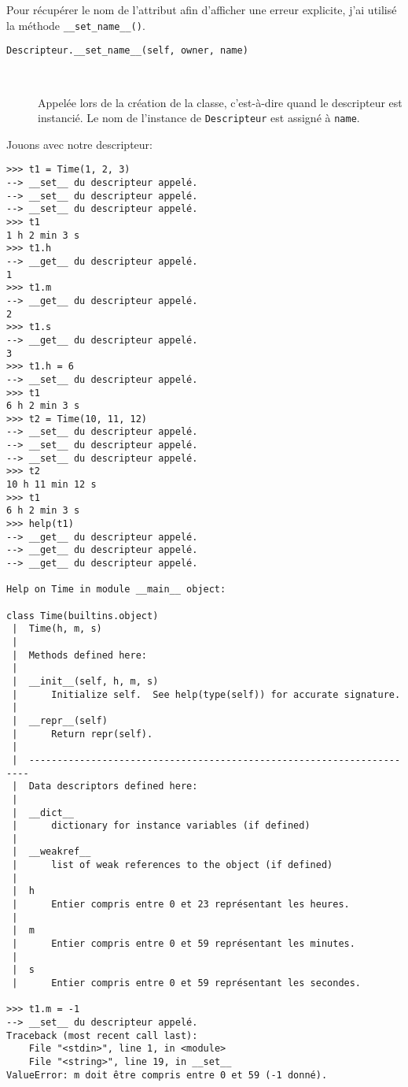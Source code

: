 Pour récupérer le nom de l'attribut afin d'afficher une erreur explicite, j'ai utilisé la méthode \texttt{__set_name__()}.

\begin{description}
    \item[\texttt{Descripteur.__set_name__(self, owner, name)}]~
    
    Appelée lors de la création de la classe, c'est-à-dire quand le descripteur est instancié. Le nom de l'instance de \texttt{Descripteur} est assigné à \texttt{name}.
\end{description}

Jouons avec notre descripteur:

\begin{verbatim}
>>> t1 = Time(1, 2, 3)
--> __set__ du descripteur appelé.
--> __set__ du descripteur appelé.
--> __set__ du descripteur appelé.
>>> t1
1 h 2 min 3 s
>>> t1.h
--> __get__ du descripteur appelé.
1
>>> t1.m
--> __get__ du descripteur appelé.
2
>>> t1.s
--> __get__ du descripteur appelé.
3
>>> t1.h = 6
--> __set__ du descripteur appelé.
>>> t1
6 h 2 min 3 s
>>> t2 = Time(10, 11, 12)
--> __set__ du descripteur appelé.
--> __set__ du descripteur appelé.
--> __set__ du descripteur appelé.
>>> t2
10 h 11 min 12 s
>>> t1
6 h 2 min 3 s
>>> help(t1)
--> __get__ du descripteur appelé.
--> __get__ du descripteur appelé.
--> __get__ du descripteur appelé.

Help on Time in module __main__ object:

class Time(builtins.object)
 |  Time(h, m, s)
 |  
 |  Methods defined here:
 |  
 |  __init__(self, h, m, s)
 |      Initialize self.  See help(type(self)) for accurate signature.
 |  
 |  __repr__(self)
 |      Return repr(self).
 |  
 |  ----------------------------------------------------------------------
 |  Data descriptors defined here:
 |  
 |  __dict__
 |      dictionary for instance variables (if defined)
 |  
 |  __weakref__
 |      list of weak references to the object (if defined)
 |  
 |  h
 |      Entier compris entre 0 et 23 représentant les heures.
 |  
 |  m
 |      Entier compris entre 0 et 59 représentant les minutes.
 |  
 |  s
 |      Entier compris entre 0 et 59 représentant les secondes.

>>> t1.m = -1
--> __set__ du descripteur appelé.
Traceback (most recent call last):
    File "<stdin>", line 1, in <module>
    File "<string>", line 19, in __set__
ValueError: m doit être compris entre 0 et 59 (-1 donné).
\end{verbatim}

